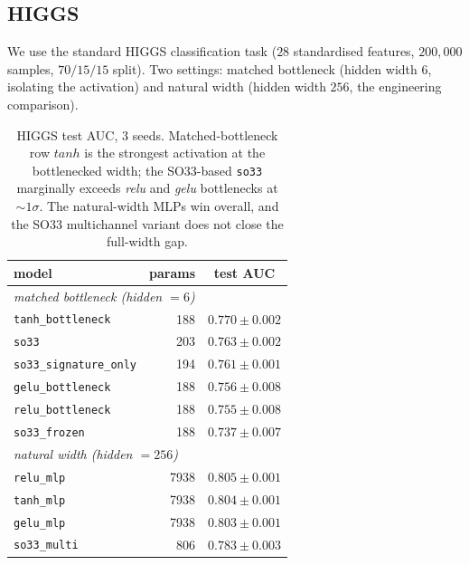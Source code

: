 \documentclass[11pt]{article}
\begin{document}
\subsection{HIGGS}
\label{sec:exp-higgs}

We use the standard HIGGS classification task ($28$ standardised
features, $200{,}000$ samples, $70/15/15$ split). Two settings: matched
bottleneck (hidden width $6$, isolating the activation) and natural
width (hidden width $256$, the engineering comparison).

\begin{table}[t]
  \centering
  \caption{HIGGS test AUC, $3$ seeds. Matched-bottleneck row $\mathit{tanh}$ is
    the strongest activation at the bottlenecked width; the SO33-based
    \texttt{so33} marginally exceeds \emph{relu} and \emph{gelu}
    bottlenecks at $\sim 1\sigma$. The natural-width MLPs win overall,
    and the SO33 multichannel variant does not close the full-width
    gap.}
  \label{tab:higgs}
  \begin{tabular}{lrc}
    \toprule
    model & params & test AUC \\
    \midrule
    \multicolumn{3}{l}{\textit{matched bottleneck (hidden $=6$)}} \\
    \texttt{tanh\_bottleneck}     & 188 & $\mathbf{0.770\pm 0.002}$ \\
    \texttt{so33}                 & 203 & $0.763\pm 0.002$ \\
    \texttt{so33\_signature\_only}& 194 & $0.761\pm 0.001$ \\
    \texttt{gelu\_bottleneck}     & 188 & $0.756\pm 0.008$ \\
    \texttt{relu\_bottleneck}     & 188 & $0.755\pm 0.008$ \\
    \texttt{so33\_frozen}         & 188 & $0.737\pm 0.007$ \\
    \midrule
    \multicolumn{3}{l}{\textit{natural width (hidden $=256$)}} \\
    \texttt{relu\_mlp}            & 7938 & $\mathbf{0.805\pm 0.001}$ \\
    \texttt{tanh\_mlp}            & 7938 & $0.804\pm 0.001$ \\
    \texttt{gelu\_mlp}            & 7938 & $0.803\pm 0.001$ \\
    \texttt{so33\_multi}          & 806  & $0.783\pm 0.003$ \\
    \bottomrule
  \end{tabular}
\end{table}
\end{document}
